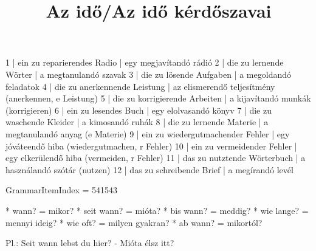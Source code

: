\begin{exmp}
1 | ein zu reparierendes Radio | egy megjavítandó rádió
2 | die zu lernende Wörter | a megtanulandó szavak
3 | die zu lösende Aufgaben | a megoldandó feladatok
4 | die zu anerkennende Leistung | az elismerendő teljesítmény (anerkennen, e Leistung)
5 | die zu korrigierende Arbeiten | a kijavítandó munkák (korrigieren)
6 | ein zu lesendes Buch | egy elolvasandó könyv
7 | die zu waschende Kleider | a kimosandó ruhák
8 | die zu lernende Materie | a megtanulandó anyag (e Materie)
9 | ein zu wiedergutmachender Fehler | egy jóváteendő hiba (wiedergutmachen, r Fehler)
10 | ein zu vermeidender Fehler | egy elkerülendő hiba (vermeiden, r Fehler)
11 | das zu nutztende Wörterbuch | a használandó szótár (nutzen)
12 | das zu schreibende Brief | a megírandó levél
\end{exmp}

\title{Az idő/Az idő kérdőszavai}

GrammarItemIndex = 541543

\begin{desc}
* wann? = mikor?
* seit wann? = mióta?
* bis wann? = meddig?
* wie lange? = mennyi ideig?
* wie oft? = milyen gyakran?
* ab wann? = mikortól?

Pl.: Seit wann lebst du hier? - Mióta élsz itt?
\end{desc}

